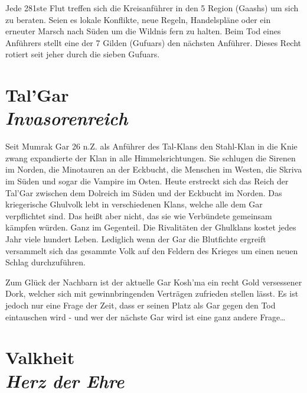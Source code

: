 Jede 281ste Flut treffen sich die Kreisanführer in den 5 Region (Gaashs) um sich zu beraten. Seien es lokale Konflikte, neue Regeln, Handelspläne oder ein erneuter Marsch nach Süden um die Wildnis fern zu halten. Beim Tod eines Anführers stellt eine der 7 Gilden (Gufuars) den nächsten Anführer. Dieses Recht rotiert seit jeher durch die sieben Gufuars.

\section*{Tal’Gar \\ \textit{Invasorenreich}}

Seit Mumrak Gar 26 n.Z. als Anführer des Tal-Klans den Stahl-Klan in die Knie zwang expandierte der Klan in alle Himmelsrichtungen. Sie schlugen die Sirenen im Norden, die Minotauren an der Eckbucht, die Menschen im Westen, die Skriva im Süden und sogar die Vampire im Osten. Heute erstreckt sich das Reich der Tal’Gar zwischen dem Dolreich im Süden und der Eckbucht im Norden. Das kriegerische Ghulvolk lebt in verschiedenen Klans, welche alle dem Gar verpflichtet sind. Das heißt aber nicht, das sie wie Verbündete gemeinsam kämpfen würden. Ganz im Gegenteil. Die Rivalitäten der Ghulklans kostet jedes Jahr viele hundert Leben. Lediglich wenn der Gar die Blutfichte ergreift versammelt sich das gesammte Volk auf den Feldern des Krieges um einen neuen Schlag durchzuführen.

Zum Glück der Nachbarn ist der aktuelle Gar Kosh’ma ein recht Gold versessener Dork, welcher sich mit gewinnbringenden Verträgen zufrieden stellen lässt. Es ist jedoch nur eine Frage der Zeit, dass er seinen Platz als Gar gegen den Tod eintauschen wird - und wer der nächste Gar wird ist eine ganz andere Frage…

\section*{Valkheit \\ \textit{Herz der Ehre}}

